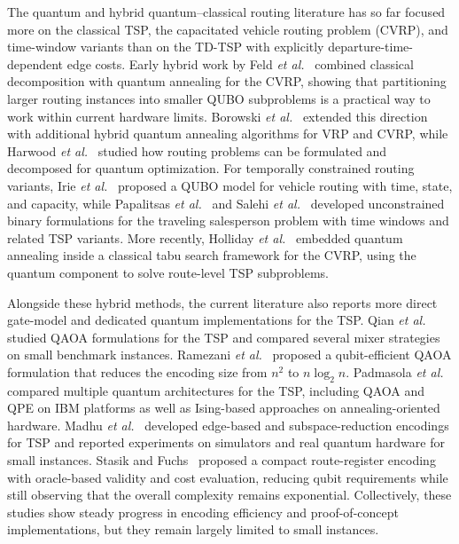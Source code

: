 \documentclass[conference]{IEEEtran}
\begin{document}
The quantum and hybrid quantum--classical routing literature has so far focused more on the classical TSP, the capacitated vehicle routing problem (CVRP), and time-window variants than on the TD-TSP with explicitly departure-time-dependent edge costs. Early hybrid work by Feld \emph{et al.}~\cite{Feld2019} combined classical decomposition with quantum annealing for the CVRP, showing that partitioning larger routing instances into smaller QUBO subproblems is a practical way to work within current hardware limits. Borowski \emph{et al.}~\cite{Borowski2020} extended this direction with additional hybrid quantum annealing algorithms for VRP and CVRP, while Harwood \emph{et al.}~\cite{Harwood2021} studied how routing problems can be formulated and decomposed for quantum optimization. For temporally constrained routing variants, Irie \emph{et al.}~\cite{Irie2019} proposed a QUBO model for vehicle routing with time, state, and capacity, while Papalitsas \emph{et al.}~\cite{Papalitsas2019} and Salehi \emph{et al.}~\cite{Salehi2022} developed unconstrained binary formulations for the traveling salesperson problem with time windows and related TSP variants. More recently, Holliday \emph{et al.}~\cite{Holliday2025} embedded quantum annealing inside a classical tabu search framework for the CVRP, using the quantum component to solve route-level TSP subproblems.

Alongside these hybrid methods, the current literature also reports more direct gate-model and dedicated quantum implementations for the TSP. Qian \emph{et al.}~\cite{Qian2023} studied QAOA formulations for the TSP and compared several mixer strategies on small benchmark instances. Ramezani \emph{et al.}~\cite{Ramezani2024} proposed a qubit-efficient QAOA formulation that reduces the encoding size from $n^2$ to $n\log_2 n$. Padmasola \emph{et al.}~\cite{Padmasola2025} compared multiple quantum architectures for the TSP, including QAOA and QPE on IBM platforms as well as Ising-based approaches on annealing-oriented hardware. 
Madhu \emph{et al.}~\cite{Madhu2025} developed edge-based and subspace-reduction encodings for TSP and reported experiments on simulators and real quantum hardware for small instances. Stasik and Fuchs~\cite{Stasik2026} proposed a compact route-register encoding with oracle-based validity and cost evaluation, reducing qubit requirements while still observing that the overall complexity remains exponential. Collectively, these studies show steady progress in encoding efficiency and proof-of-concept implementations, but they remain largely limited to small instances.
\end{document}
